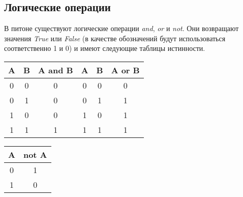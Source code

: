 \documentclass[a4paper, fleqn]{article}
\begin{document}
	\subsection*{Логические операции}
	
	В питоне существуют логические операции \emph{and}, \emph{or} и \emph{not}. Они возвращают значения \emph{True} или \emph{False} (в качестве обозначений будут использоваться соответственно 1 и 0) и имеют следующие таблицы истинности.
	
	\begin{tabular}{cc|c|cc|c}
		A&  B&  A and B&  A&  B&  A or B\\ 
		\hline
		0&  0&  0&  0&  0&  0\\ 
		0&  1&  0&  0&  1&  1\\ 
		1&  0&  0&  1&  0&  1\\ 
		1&  1&  1&  1&  1&  1\\ 
	\end{tabular} 
	\begin{tabular}{c|c}
		A&  not A\\ 
		\hline  
		0&  1\\ 
		1&  0\\  
	\end{tabular} 
\end{document}
